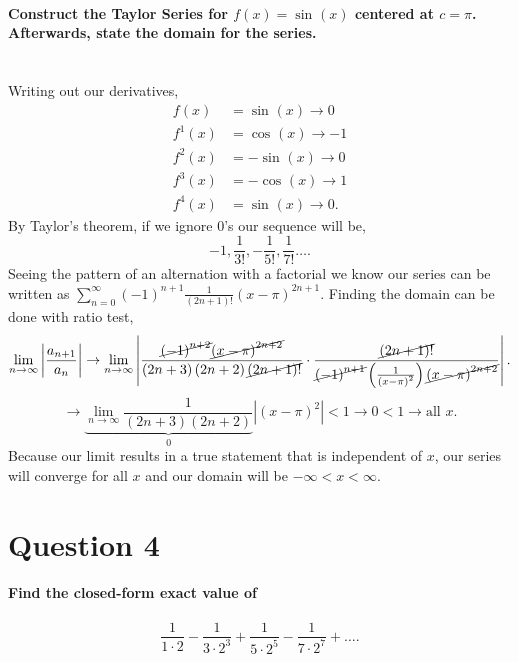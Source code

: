 \documentclass{report}
\begin{document}
\paragraph{Construct the Taylor Series for $ f\left( x \right) =\sin^{  } \left( x \right)  $ centered at $ c=\pi $. Afterwards, state the domain for the series.\\ \\ }
Writing out our derivatives,
\begin{align*}
	f\left( x \right) &=\sin^{  } \left( x \right) \to 0\\
	f^{ 1 }\left( x \right) &= \cos^{  } \left( x \right) \to -1 \\
	f^{ 2 }\left( x \right) &= -\sin^{  } \left( x \right) \to 0 \\
	f^{ 3 }\left( x \right) &= -\cos^{  } \left( x \right) \to 1 \\
	f^{ 4 }\left( x \right) &= \sin^{  } \left( x \right) \to 0 
.\end{align*}
By Taylor's theorem, if we ignore 0's our sequence will be,
\[
-1, \frac{ 1 }{ 3! }, -\frac{ 1 }{ 5! } , \frac{ 1 }{ 7! } \ldots
.\] 
Seeing the pattern of an alternation with a factorial we know our series can be written as $ \sum_{ n=0 } ^{ \infty } \left( -1 \right) ^{ n+1 }\frac{ 1 }{ \left( 2n+1 \right) ! } \left( x-\pi \right) ^{ 2n+1 } $. Finding the domain can be done with ratio test,
\[
	\lim_{ n \to \infty} \left| \frac{ a_{ n+1 } }{ a_n } \right| \to \lim_{ n \to \infty} \left| \frac{ \cancel{\left( -1 \right) ^{ n+2 }} \cancel{\left( x-\pi  \right) ^{ 2n+2 }} }{ \left( 2n+3 \right)\left( 2n+2 \right) \cancel{\left( 2n+1 \right) !}  }\cdot \frac{ \cancel{\left( 2n+1 \right) !} }{\cancel{\left( -1 \right)^{ n+1 }}\left( \frac{ 1 }{\left( x-\pi  \right) ^2} \right) \cancel{\left( x-\pi  \right) ^{ 2n+2 }} } \right|
.\] 
\[
\to \underbrace{ \lim_{ n \to \infty} \frac{ 1 }{ \left( 2n+3 \right) \left( 2n+2 \right) } }_{ 0 }  \left|\left( x-\pi  \right) ^2\right| < 1 \to 0 < 1 \to \text{all } x
.\] 
Because our limit results in a true statement that is independent of $ x $, our series will converge for all $ x $ and our domain will be $ -\infty<x<\infty $.

\section*{Question 4}%
\label{sec:Question 4}
\paragraph{Find the closed-form exact value of }
\[
\frac{ 1 }{ 1\cdot 2 } - \frac{ 1 }{ 3\cdot 2^3 } +\frac{ 1 }{ 5\cdot 2^{ 5 } } -\frac{ 1 }{ 7\cdot 2^{ 7 } } + \ldots
.\]
\end{document}
